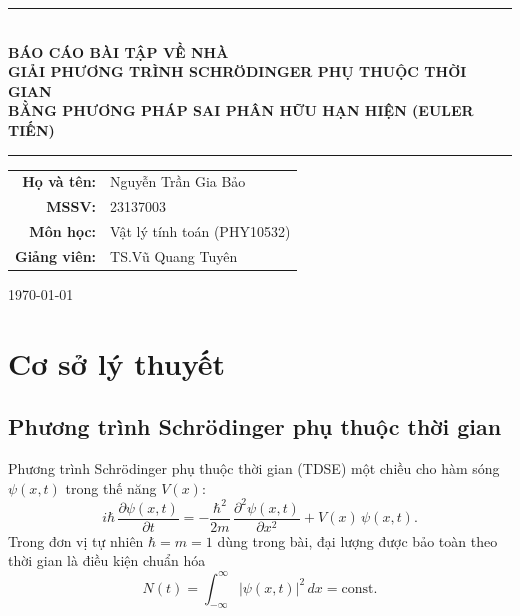 \documentclass[12pt,a4paper]{article}
\begin{document}
\begin{titlepage}
    \centering
    \vspace*{2cm}
    \rule{\textwidth}{1pt} \\[0.5cm]
    {\huge \textbf{BÁO CÁO BÀI TẬP VỀ NHÀ}} \\[0.4cm]
    {\large \textbf{GIẢI PHƯƠNG TRÌNH SCHRÖDINGER PHỤ THUỘC THỜI GIAN}} \\[0.2cm]
    {\large \textbf{BẰNG PHƯƠNG PHÁP SAI PHÂN HỮU HẠN HIỆN (EULER TIẾN)}} \\[0.2cm]
    \rule{\textwidth}{1pt}

    \vspace{2cm}

   {\large
    \begin{tabular}{rl}
        \textbf{Họ và tên:}  & Nguyễn Trần Gia Bảo \\[4pt]
        \textbf{MSSV:}       & 23137003 \\[4pt]
        \textbf{Môn học:}    & Vật lý tính toán (PHY10532) \\[4pt]
        \textbf{Giảng viên:} & TS.\@ Vũ Quang Tuyên \\
    \end{tabular}
    }

    \vfill
    {\large \today}
\end{titlepage}

\newpage
\tableofcontents
\newpage

\section{Cơ sở lý thuyết}

\subsection{Phương trình Schrödinger phụ thuộc thời gian}

Phương trình Schrödinger phụ thuộc thời gian (TDSE) một chiều cho hàm sóng $\psi(x,t)$ trong thế năng $V(x)$:
\begin{equation}
i\hbar\,\frac{\partial \psi(x,t)}{\partial t} = -\frac{\hbar^2}{2m}\,\frac{\partial^2 \psi(x,t)}{\partial x^2} + V(x)\,\psi(x,t).
\label{eq:tdse}
\end{equation}
Trong đơn vị tự nhiên $\hbar=m=1$ dùng trong bài, đại lượng được bảo toàn theo thời gian là điều kiện chuẩn hóa
\begin{equation}
N(t) = \int_{-\infty}^{\infty} |\psi(x,t)|^2\,dx = \text{const}.
\label{eq:norm}
\end{equation}
\end{document}
